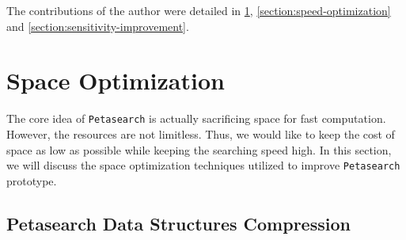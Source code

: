 The contributions of the author were detailed in \cref{section:space-optimization}, \cref{section:speed-optimization} and \cref{section:sensitivity-improvement}.


\section{Space Optimization} \label{section:space-optimization}

The core idea of \texttt{Petasearch} is actually sacrificing space for fast computation.
However, the resources are not limitless.
Thus, we would like to keep the cost of space as low as possible while keeping the searching speed high.
In this section, we will discuss the space optimization techniques utilized to improve \texttt{Petasearch} prototype.

\subsection{Petasearch Data Structures Compression} \label{section:diff-index_compression}

